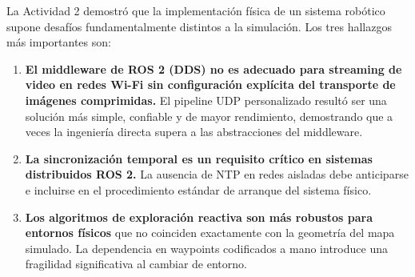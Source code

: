 \documentclass[12pt,a4paper]{article}
\begin{document}
La Actividad 2 demostr\'o que la implementaci\'on f\'isica de un sistema rob\'otico supone desaf\'ios fundamentalmente distintos a la simulaci\'on. Los tres hallazgos m\'as importantes son:

\begin{enumerate}
    \item \textbf{El middleware de ROS 2 (DDS) no es adecuado para streaming de video en redes Wi-Fi sin configuraci\'on expl\'icita del transporte de im\'agenes comprimidas.} El pipeline UDP personalizado result\'o ser una soluci\'on m\'as simple, confiable y de mayor rendimiento, demostrando que a veces la ingenier\'ia directa supera a las abstracciones del middleware.
    \item \textbf{La sincronizaci\'on temporal es un requisito cr\'itico en sistemas distribuidos ROS 2.} La ausencia de NTP en redes aisladas debe anticiparse e incluirse en el procedimiento est\'andar de arranque del sistema f\'isico.
    \item \textbf{Los algoritmos de exploraci\'on reactiva son m\'as robustos para entornos f\'isicos} que no coinciden exactamente con la geometr\'ia del mapa simulado. La dependencia en waypoints codificados a mano introduce una fragilidad significativa al cambiar de entorno.
\end{enumerate}
\end{document}
